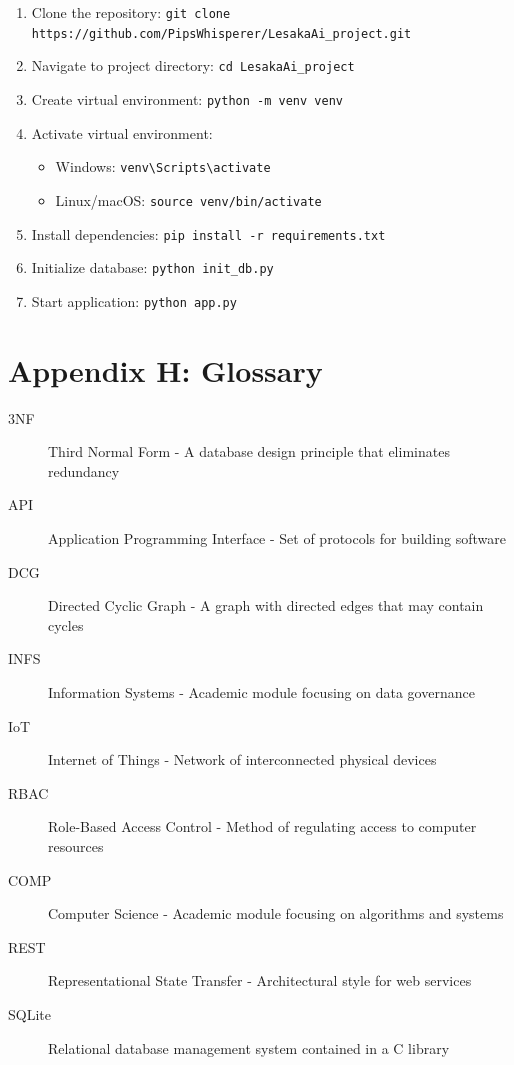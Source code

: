 \begin{enumerate}
    \item Clone the repository: \texttt{git clone https://github.com/PipsWhisperer/LesakaAi\_project.git}
    \item Navigate to project directory: \texttt{cd LesakaAi\_project}
    \item Create virtual environment: \texttt{python -m venv venv}
    \item Activate virtual environment:
    \begin{itemize}
        \item Windows: \texttt{venv\textbackslash Scripts\textbackslash activate}
        \item Linux/macOS: \texttt{source venv/bin/activate}
    \end{itemize}
    \item Install dependencies: \texttt{pip install -r requirements.txt}
    \item Initialize database: \texttt{python init\_db.py}
    \item Start application: \texttt{python app.py}
\end{enumerate}

\section*{Appendix H: Glossary}

\begin{description}
    \item[3NF] Third Normal Form - A database design principle that eliminates redundancy
    \item[API] Application Programming Interface - Set of protocols for building software
    \item[DCG] Directed Cyclic Graph - A graph with directed edges that may contain cycles
    \item[INFS] Information Systems - Academic module focusing on data governance
    \item[IoT] Internet of Things - Network of interconnected physical devices
    \item[RBAC] Role-Based Access Control - Method of regulating access to computer resources
    \item[COMP] Computer Science - Academic module focusing on algorithms and systems
    \item[REST] Representational State Transfer - Architectural style for web services
    \item[SQLite] Relational database management system contained in a C library
\end{description}

